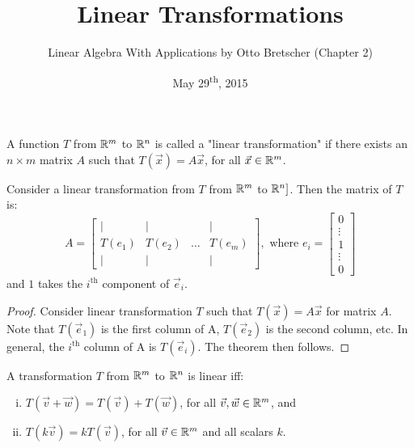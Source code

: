 \documentclass[a4paper,8pt]{article}
\title{Linear Transformations}
\author{Linear Algebra With Applications by Otto Bretscher (Chapter 2)}
\date{May 29\textsuperscript{th}, 2015}
\begin{document}
\maketitle
{}

\begin{outline}


    A function \(T\) from \(\mathbb{R}^m\) to \(\mathbb{R}^n\) is called a "linear transformation" if there exists
    an \(n \times m\) matrix \(A\) such that \(T(\vec{x}) = A\vec{x}\), for all \(\vec{x} \in \mathbb{R}^m\).

    Consider a linear transformation from \(T\) from \(\mathbb{R}^m\) to \(\mathbb{R}^n]\). Then the matrix of \(T\) is:
    \[
      A =
        \begin{bmatrix}
          \vert  & \vert  &        & \vert  \\
          T(e_1) & T(e_2) & \ldots & T(e_m) \\
          \vert  & \vert  &        & \vert
        \end{bmatrix}
      ,\text{ where } e_{i} = \begin{bmatrix} 0 \\ \vdots \\ 1 \\ \vdots \\ 0 \end{bmatrix}
    \]
    and \(1\) takes the \(i^{\text{th}}\) component of \(\vec{e}_i\).

    \begin{proof}
      Consider linear transformation \(T\) such that \(T(\vec{x}) = A\vec{x}\) for matrix \(A\). Note that
      \(T(\vec{e}_1)\) is the first column of A, \(T(\vec{e}_2)\) is the second column, etc. In general, the
      \(i^{\text{th}}\) column of A is \(T(\vec{e}_i)\). The theorem then follows.
    \end{proof}

    A transformation \(T\) from \(\mathbb{R}^m\) to \(\mathbb{R}^n\) is linear iff:
    \begin{enumerate}[i.]
      \item \(T(\vec{v} + \vec{w}) = T(\vec{v}) + T(\vec{w})\), for all \(\vec{v}, \vec{w} \in \mathbb{R}^m\), and
      \item \(T(k\vec{v}) = kT(\vec{v})\), for all \(\vec{v} \in \mathbb{R}^m\) and all scalars \(k\).
    \end{enumerate}


\end{outline}
\end{document}
